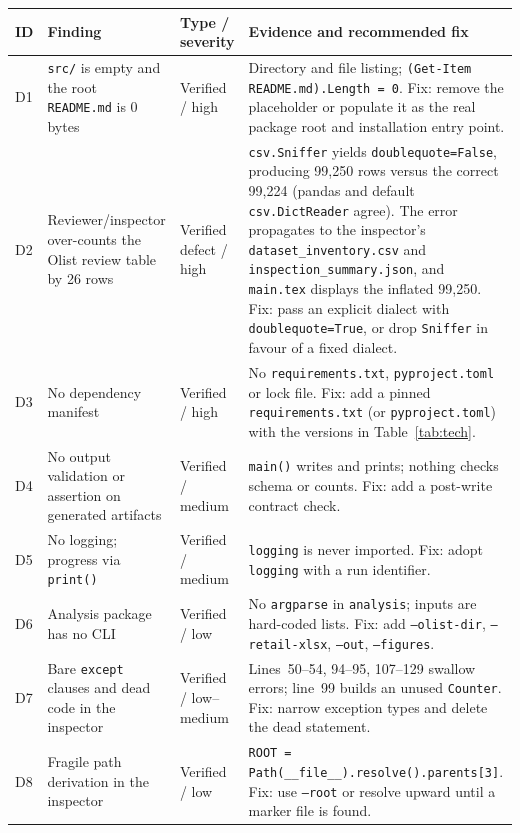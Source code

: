 \documentclass[11pt,a4paper]{article}
\newcommand{\code}[1]{\texttt{#1}}
\begin{document}
\begin{table}[H]
\centering
\footnotesize
\begin{tabularx}{\textwidth}{L{0.7cm}L{4.1cm}L{1.6cm}X}
\toprule
\textbf{ID} & \textbf{Finding} & \textbf{Type / severity} & \textbf{Evidence and recommended fix} \\
\midrule
D1 & \code{src/} is empty and the root \code{README.md} is 0 bytes & Verified / high & Directory and file listing; \code{(Get-Item README.md).Length = 0}. Fix: remove the placeholder or populate it as the real package root and installation entry point. \\
D2 & Reviewer/inspector over-counts the Olist review table by 26 rows & Verified defect / high & \code{csv.Sniffer} yields \code{doublequote=False}, producing 99{,}250 rows versus the correct 99{,}224 (pandas and default \code{csv.DictReader} agree). The error propagates to the inspector's \code{dataset\_inventory.csv} and \code{inspection\_summary.json}, and \code{main.tex} displays the inflated 99{,}250. Fix: pass an explicit dialect with \code{doublequote=True}, or drop \code{Sniffer} in favour of a fixed dialect. \\
D3 & No dependency manifest & Verified / high & No \code{requirements.txt}, \code{pyproject.toml} or lock file. Fix: add a pinned \code{requirements.txt} (or \code{pyproject.toml}) with the versions in Table~\ref{tab:tech}. \\
D4 & No output validation or assertion on generated artifacts & Verified / medium & \code{main()} writes and prints; nothing checks schema or counts. Fix: add a post-write contract check. \\
D5 & No logging; progress via \code{print()} & Verified / medium & \code{logging} is never imported. Fix: adopt \code{logging} with a run identifier. \\
D6 & Analysis package has no CLI & Verified / low & No \code{argparse} in \code{analysis}; inputs are hard-coded lists. Fix: add \code{--olist-dir}, \code{--retail-xlsx}, \code{--out}, \code{--figures}. \\
D7 & Bare \code{except} clauses and dead code in the inspector & Verified / low--medium & Lines~50--54, 94--95, 107--129 swallow errors; line~99 builds an unused \code{Counter}. Fix: narrow exception types and delete the dead statement. \\
D8 & Fragile path derivation in the inspector & Verified / low & \code{ROOT = Path(\_\_file\_\_).resolve().parents[3]}. Fix: use \code{--root} or resolve upward until a marker file is found. \\

\end{tabularx}
\end{table}
\end{document}
